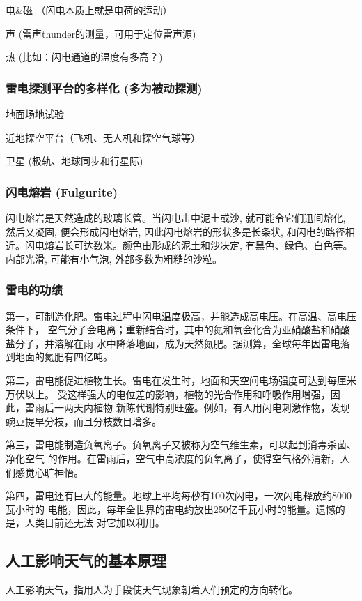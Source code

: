 \documentclass[12pt,a4paper]{article}
\begin{document}
	电\&磁 （闪电本质上就是电荷的运动）
	
	声 (雷声thunder的测量，可用于定位雷声源)
	
	热 (比如：闪电通道的温度有多高？)
	
	\subsubsection{雷电探测平台的多样化 (多为被动探测)}
	地面场地试验
	
	近地探空平台（飞机、无人机和探空气球等）
	
	卫星 (极轨、地球同步和行星际)
	\subsubsection{闪电熔岩 (Fulgurite)}
	
	闪电熔岩是天然造成的玻璃长管。当闪电击中泥土或沙, 就可能令它们迅间熔化, 然后又凝固, 便会形成闪电熔岩, 因此闪电熔岩的形状多是长条状, 和闪电的路径相近。闪电熔岩长可达数米。颜色由形成的泥土和沙决定, 有黑色、绿色、白色等。内部光滑, 可能有小气泡, 外部多数为粗糙的沙粒。
	
	\subsubsection{雷电的功绩}
	第一，可制造化肥。雷电过程中闪电温度极高，并能造成高电压。在高温、高电压条件下，
	空气分子会电离；重新结合时，其中的氮和氧会化合为亚硝酸盐和硝酸盐分子，并溶解在雨
	水中降落地面，成为天然氮肥。据测算，全球每年因雷电落到地面的氮肥有四亿吨。
	
	第二，雷电能促进植物生长。雷电在发生时，地面和天空间电场强度可达到每厘米万伏以上。
	受这样强大的电位差的影响，植物的光合作用和呼吸作用增强，因此，雷雨后一两天内植物
	新陈代谢特别旺盛。例如，有人用闪电刺激作物，发现豌豆提早分枝，而且分枝数目增多。
	
	第三，雷电能制造负氧离子。负氧离子又被称为空气维生素，可以起到消毒杀菌、净化空气
	的作用。在雷雨后，空气中高浓度的负氧离子，使得空气格外清新，人们感觉心旷神怡。
	
	第四，雷电还有巨大的能量。地球上平均每秒有100次闪电，一次闪电释放约8000瓦小时的
	电能，因此，每年全世界的雷电约放出250亿千瓦小时的能量。遗憾的是，人类目前还无法
	对它加以利用。
	\subsection{人工影响天气的基本原理}
	人工影响天气，指用人为手段使天气现象朝着人们预定的方向转化。
	
\end{document}
